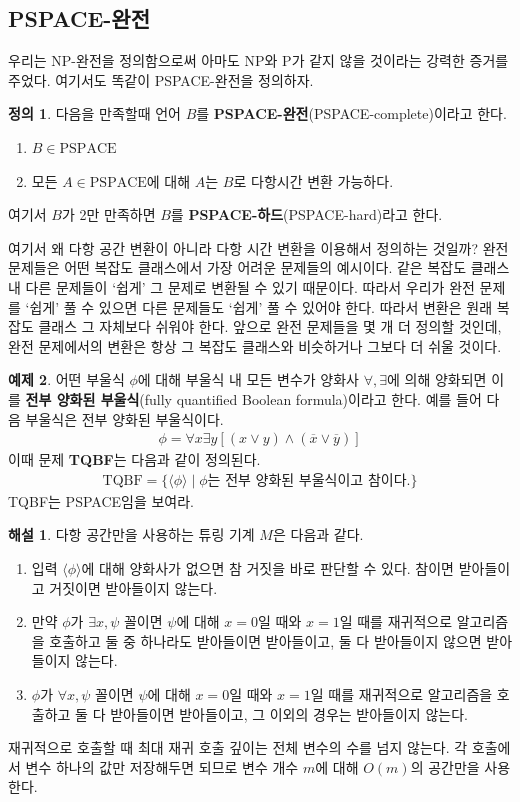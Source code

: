 \documentclass[a4paper, 11pt]{article}
\theoremstyle{definition}
\newtheorem{defn}{정의}[section]
\newtheorem{ex}[defn]{예제}
\newtheorem*{ans*}{해설}
\begin{document}
\subsection{PSPACE-완전}
우리는 NP-완전을 정의함으로써 아마도 NP와 P가 같지 않을 것이라는 강력한 증거를 주었다. 여기서도 똑같이 PSPACE-완전을 정의하자.
\begin{defn}
    다음을 만족할때 언어 $B$를 \textbf{PSPACE-완전}(PSPACE-complete)이라고 한다.
    \begin{enumerate}
        \item $B \in \text{PSPACE}$
        \item 모든 $A \in \text{PSPACE} $에 대해 $A$는 $B$로 다항시간 변환 가능하다.
    \end{enumerate}
    여기서 $B$가 2만 만족하면 $B$를 \textbf{PSPACE-하드}(PSPACE-hard)라고 한다.
\end{defn}
여기서 왜 다항 공간 변환이 아니라 다항 시간 변환을 이용해서 정의하는 것일까? 완전 문제들은 어떤 복잡도 클래스에서 가장 어려운 문제들의 예시이다. 같은 복잡도 클래스 내 다른 문제들이 `쉽게' 그 문제로 변환될 수 있기 때문이다. 따라서 우리가 완전 문제를 `쉽게' 풀 수 있으면 다른 문제들도 `쉽게' 풀 수 있어야 한다. 따라서 변환은 원래 복잡도 클래스 그 자체보다 쉬워야 한다. 앞으로 완전 문제들을 몇 개 더 정의할 것인데, 완전 문제에서의 변환은 항상 그 복잡도 클래스와 비슷하거나 그보다 더 쉬울 것이다.
\begin{ex}\label{TQBF PSPAPCE}
    어떤 부울식 $\phi$에 대해 부울식 내 모든 변수가 양화사 $\forall, \exists$에 의해 양화되면 이를 \textbf{전부 양화된 부울식}(fully quantified Boolean formula)이라고 한다. 예를 들어 다음 부울식은 전부 양화된 부울식이다.
    \begin{align*}
        \phi = \forall x \exists y [(x \vee y) \wedge (\overline{x} \vee \overline{y})]
    \end{align*}
    이때 문제 \textbf{TQBF}는 다음과 같이 정의된다.
    \begin{align*}
        \text{TQBF} = \{\langle \phi \rangle \;\vert\; \phi \text{는 전부 양화된 부울식이고 참이다.} \}
    \end{align*}
    TQBF는 PSPACE임을 보여라.
\end{ex}
\begin{ans*}
    다항 공간만을 사용하는 튜링 기계 $M$은 다음과 같다.
    \begin{enumerate}
        \item 입력 $\langle \phi \rangle$에 대해 양화사가 없으면 참 거짓을 바로 판단할 수 있다. 참이면 받아들이고 거짓이면 받아들이지 않는다.
        \item 만약 $\phi$가 $\exists x, \psi$ 꼴이면 $\psi$에 대해 $x=0$일 때와 $x=1$일 때를 재귀적으로 알고리즘을 호출하고 둘 중 하나라도 받아들이면 받아들이고, 둘 다 받아들이지 않으면 받아들이지 않는다.
        \item $\phi$가 $\forall x, \psi$ 꼴이면 $\psi$에 대해 $x=0$일 때와 $x=1$일 때를 재귀적으로 알고리즘을 호출하고 둘 다 받아들이면 받아들이고, 그 이외의 경우는 받아들이지 않는다.
    \end{enumerate}
    재귀적으로 호출할 때 최대 재귀 호출 깊이는 전체 변수의 수를 넘지 않는다. 각 호출에서 변수 하나의 값만 저장해두면 되므로 변수 개수 $m$에 대해 $O(m)$의 공간만을 사용한다.
\end{ans*}
\end{document}
